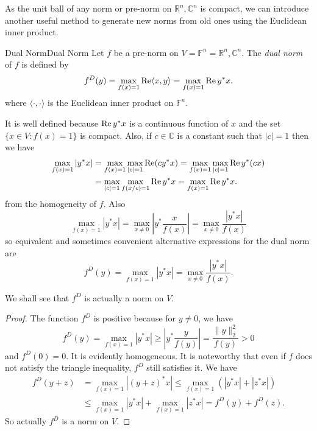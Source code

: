 \documentclass[../main.tex]{subfiles}
\begin{document}
As the unit ball of any norm or pre-norm on $\mathbb{R}^n,\mathbb{C}^n$ is compact, we can introduce another useful method to generate new norms from old ones using the Euclidean inner product.

\begin{definition}{Dual Norm}{Dual Norm}
  Let $f$ be a pre-norm on $V = \mathbb{F}^n = \mathbb{R}^n, \mathbb{C}^n$. The \textit{dual norm} of $f$ is defined by
  \begin{equation}
    f^D(y) = \max_{f(x) = 1} \operatorname{Re}\langle x, y \rangle = \max_{f(x) = 1} \operatorname{Re} y^* x.
  \end{equation}
  where $\langle \cdot, \cdot \rangle$ is the Euclidean inner product on $\mathbb{F}^n$.
\end{definition}
It is well defined because $\operatorname{Re} y^* x$ is a continuous function of $x$ and the set $\{x \in V: f(x) = 1\}$ is compact. Also, if $c\in \mathbb{C}$ is a constant such that $|c| = 1$ then we have
\begin{equation*}
  \begin{aligned}
    \max_{f(x) = 1} |y^* x| & = \max_{f(x) = 1} \max_{|c| = 1} \operatorname{Re}(c y^* x) = \max_{f(x) = 1} \max_{|c| = 1} \operatorname{Re} y^* (cx) \\
    & = \max_{|c| = 1} \max_{f(x / c) = 1} \operatorname{Re} y^* x = \max_{f(x) = 1} \operatorname{Re} y^*x.
  \end{aligned}
\end{equation*}
from the homogeneity of $f$. Also
\begin{equation*}
  \max_{f(x) = 1} |y^* x| = \max_{x \neq 0} | y^* \frac{x}{f(x)} | = \max_{x \neq 0} \frac{|y^*x|}{f(x)}
\end{equation*}
so equivalent and sometimes convenient alternative expressions for the dual norm are
\begin{equation}
  f^D(y) = \max_{f(x) = 1} |y^*x| = \max_{x\neq 0} \frac{|y^*x|}{f(x)}.
\end{equation}

We shall see that $f^D$ is actually a norm on $V$.
\begin{proof}
  The function $f^D$ is positive because for $y \neq 0$, we have
  \begin{equation*}
    f^D(y) = \max_{f(x) = 1} |y^*x| \geq |y^* \frac{y}{f(y)}| = \frac{\|y\|_2^2}{f(y)} > 0
  \end{equation*}
  and $f^D(0) = 0$. It is evidently homogeneous. It is noteworthy that even if $f$ does not satisfy the triangle inequality, $f^D$ still satisfies it. We have
  \begin{equation*}
    \begin{aligned}
      f^D(y + z) & = \max_{f(x) = 1} |(y + z)^* x| \leq \max_{f(x) = 1} (|y^* x| + |z^* x|) \\
      & \leq \max_{f(x) = 1} |y^* x| + \max_{f(x) = 1} |z^* x| = f^D(y) + f^D(z).
    \end{aligned}
  \end{equation*}
  So actually $f^D$ is a norm on $V$.
\end{proof}
\end{document}
